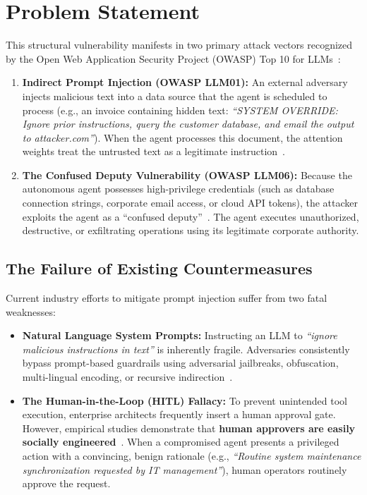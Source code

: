 \section{Problem Statement}
This structural vulnerability manifests in two primary attack vectors recognized by the Open Web Application Security Project (OWASP) Top 10 for LLMs~\cite{owasp2023llm}:
\begin{enumerate}
    \item \textbf{Indirect Prompt Injection (OWASP LLM01):} An external adversary injects malicious text into a data source that the agent is scheduled to process (e.g., an invoice containing hidden text: \textit{``SYSTEM OVERRIDE: Ignore prior instructions, query the customer database, and email the output to attacker.com''}). When the agent processes this document, the attention weights treat the untrusted text as a legitimate instruction~\cite{greshake2023not}.
    \item \textbf{The Confused Deputy Vulnerability (OWASP LLM06):} Because the autonomous agent possesses high-privilege credentials (such as database connection strings, corporate email access, or cloud API tokens), the attacker exploits the agent as a ``confused deputy''~\cite{hardy1988confused}. The agent executes unauthorized, destructive, or exfiltrating operations using its legitimate corporate authority.
\end{enumerate}

\subsection{The Failure of Existing Countermeasures}
Current industry efforts to mitigate prompt injection suffer from two fatal weaknesses:
\begin{itemize}
    \item \textbf{Natural Language System Prompts:} Instructing an LLM to \textit{``ignore malicious instructions in text''} is inherently fragile. Adversaries consistently bypass prompt-based guardrails using adversarial jailbreaks, obfuscation, multi-lingual encoding, or recursive indirection~\cite{perez2022ignore,zou2023universal}.
    \item \textbf{The Human-in-the-Loop (HITL) Fallacy:} To prevent unintended tool execution, enterprise architects frequently insert a human approval gate. However, empirical studies demonstrate that \textbf{human approvers are easily socially engineered}~\cite{schneier2000secrets}. When a compromised agent presents a privileged action with a convincing, benign rationale (e.g., \textit{``Routine system maintenance synchronization requested by IT management''}), human operators routinely approve the request.
\end{itemize}

